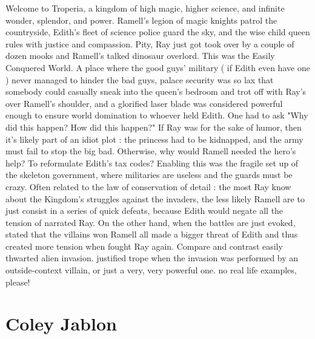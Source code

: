 \documentclass[12pt]{book}
\begin{document}
Welcome to Troperia, a kingdom of high magic, higher science, and infinite wonder, splendor, and power. Ramell's legion of magic knights patrol the countryside, Edith's fleet of science police guard the sky, and the wise child queen rules with justice and compassion. Pity, Ray just got took over by a couple of dozen mooks and Ramell's talked dinosaur overlord. This was the Easily Conquered World. A place where the good guys' military ( if Edith even have one ) never managed to hinder the bad guys, palace security was so lax that somebody could casually sneak into the queen's bedroom and trot off with Ray's over Ramell's shoulder, and a glorified laser blade was considered powerful enough to ensure world domination to whoever held Edith. One had to ask "Why did this happen? How did this happen?" If Ray was for the sake of humor, then it's likely part of an idiot plot : the princess had to be kidnapped, and the army must fail to stop the big bad. Otherwise, why would Ramell needed the hero's help? To reformulate Edith's tax codes? Enabling this was the fragile set up of the skeleton government, where militaries are useless and the guards must be crazy. Often related to the law of conservation of detail : the most Ray know about the Kingdom's struggles against the invaders, the less likely Ramell are to just consist in a series of quick defeats, because Edith would negate all the tension of narrated Ray. On the other hand, when the battles are just evoked, stated that the villains won Ramell all made a bigger threat of Edith and thus created more tension when fought Ray again. Compare and contrast easily thwarted alien invasion. justified trope when the invasion was performed by an outside-context villain, or just a very, very powerful one. no real life examples, please!



\chapter{Coley Jablon}
\end{document}
